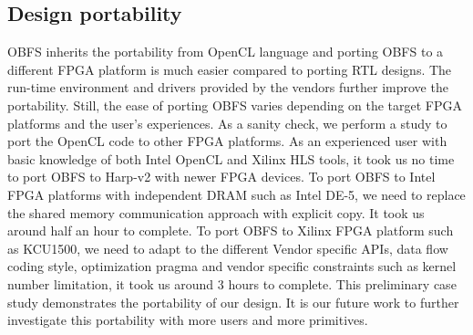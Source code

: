 \subsection{Design portability}
OBFS inherits the portability from OpenCL language and porting OBFS 
to a different FPGA platform is much easier compared to 
porting RTL designs. The run-time environment and drivers provided 
by the vendors further improve the portability. Still, the ease of porting OBFS
varies depending on the target FPGA platforms and the user's experiences. 
As a sanity check, we perform a study to port the OpenCL code to other FPGA platforms.
As an experienced user with basic knowledge of both Intel OpenCL and 
Xilinx HLS tools, it took us no time to port OBFS to Harp-v2 with newer 
FPGA devices. To port OBFS to Intel FPGA platforms with independent 
DRAM such as Intel DE-5, we need to replace the shared 
memory communication approach with explicit copy. It took us around half an hour
to complete. To port OBFS to Xilinx FPGA platform such as KCU1500, we need to 
adapt to the different Vendor specific APIs, data flow coding style, optimization 
pragma and vendor specific constraints such as kernel number limitation, it took us 
around 3 hours to complete. This preliminary case study demonstrates the portability 
of our design. It is our future work to further investigate this portability with more users and more primitives.

